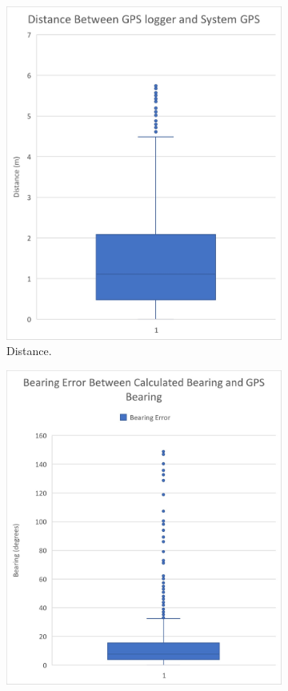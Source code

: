  \begin{figure}
 	\begin{center}
 		\begin{subfigure}{0.45\linewidth}
 			\includegraphics[width = \linewidth]{figures/distBxWh.jpg}
 			\caption{Distance.}
 			\label{fig:4:GpsBxWh}	
 		\end{subfigure}
 		\begin{subfigure}{0.475\linewidth}
 			\includegraphics[width = \linewidth]{figures/bearingBxWh.jpg}

\end{subfigure}
\end{center}
\end{figure}
